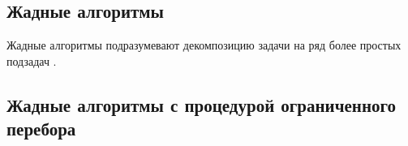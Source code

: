 \subsection{Жадные алгоритмы}
Жадные алгоритмы подразумевают декомпозицию задачи на ряд более простых подзадач \cite{Kostenko_2017}.

\subsection{Жадные алгоритмы с процедурой ограниченного перебора}